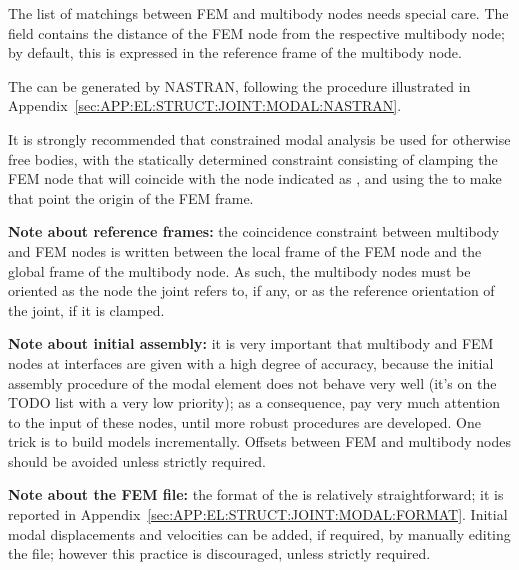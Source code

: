 The list of matchings between FEM and multibody nodes needs
special care.
The  field contains the distance
of the FEM node from the respective multibody node; by default,
this is expressed in the reference frame of the multibody node.

The  can be generated by NASTRAN, 
following the procedure illustrated
in Appendix~\ref{sec:APP:EL:STRUCT:JOINT:MODAL:NASTRAN}.

It is strongly recommended that constrained modal analysis
be used for otherwise free bodies, with the statically 
determined constraint consisting of clamping the FEM node 
that will coincide with the node indicated as ,
and using the  to make that point the origin
of the FEM frame.

\textbf{Note about reference frames:} the coincidence constraint between 
multibody and FEM nodes is written between the local frame 
of the FEM node and the global frame of the multibody node.
As such, the multibody nodes must be oriented as the 
node the  joint refers to, if any, or as the reference
orientation of the  joint, if it is clamped.

\textbf{Note about initial assembly:} it is very important that multibody 
and FEM nodes at interfaces are given with a high degree of accuracy,
because the initial assembly procedure of the modal element
does not behave very well (it's on the TODO list with a very low
priority); as a consequence, pay very much attention to the input
of these nodes, until more robust procedures are developed.
One trick is to build models incrementally.
Offsets between FEM and multibody nodes 
should be avoided unless strictly required.

\textbf{Note about the FEM file:}
the format of the  is relatively straightforward;
it is reported
in Appendix~\ref{sec:APP:EL:STRUCT:JOINT:MODAL:FORMAT}.
Initial modal displacements and velocities can be added,
if required, by manually editing the file; however this practice
is discouraged, unless strictly required.


